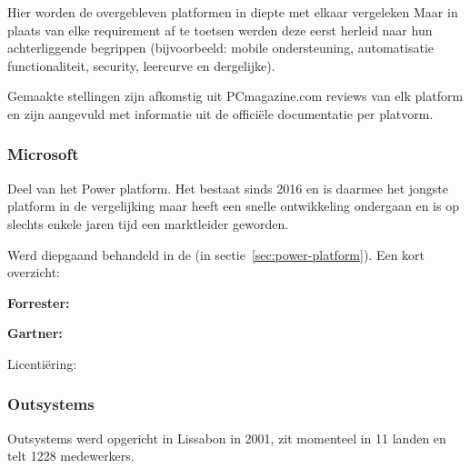 
Hier worden de overgebleven platformen in diepte met elkaar vergeleken Maar in plaats van elke requirement af te toetsen werden deze eerst herleid naar hun achterliggende begrippen (bijvoorbeeld: mobile ondersteuning, automatisatie functionaliteit, security, leercurve en dergelijke).

Gemaakte stellingen zijn afkomstig uit PCmagazine.com reviews van elk platform en zijn aangevuld met informatie uit de officiële documentatie per platvorm.

\subsubsection{Microsoft}

Deel van het Power platform. Het bestaat sinds 2016 en is daarmee het jongste platform in de vergelijking maar heeft een snelle ontwikkeling ondergaan en is op slechts enkele jaren tijd een marktleider geworden.

Werd diepgaand behandeld in de (in sectie~\ref{sec:power-platform}). Een kort overzicht:


\textbf{Forrester:} 

\textbf{Gartner:} 

Licentiëring:  

\subsubsection{Outsystems}

Outsystems werd opgericht in Lissabon in 2001, zit momenteel in 11 landen en telt 1228 medewerkers.

